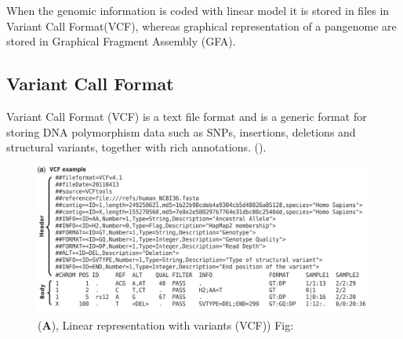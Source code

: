 When the genomic information is coded with linear model it is stored in files in Variant Call Format(VCF), whereas graphical representation of a pangenome are stored in Graphical Fragment Assembly (GFA). 



\subsection{Variant Call Format}
Variant Call Format (VCF) is a text file format and is a generic format for storing DNA polymorphism data such as SNPs, insertions, deletions and structural variants, together with rich annotations. (\cite{10.1093/bioinformatics/btr330}). 


\begin{figure}[H]
\centering
\includegraphics[width=1.00\textwidth]{fig/vcf.png}
\decoRule
\caption{(\textbf{A}), Linear representation with variants (VCF)) Fig:\cite{10.1093/bioinformatics/btr330}}
\label{fig:vcf.png}
\end{figure}



